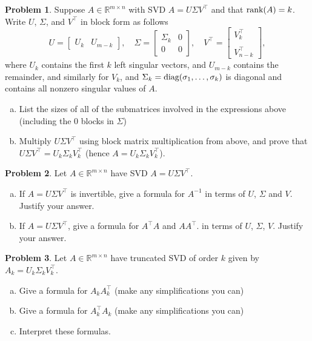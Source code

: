 \documentclass{amsart}[11pt]
\theoremstyle{definition}
\newtheorem{problem}{Problem}
\newcommand{\R}{\mathbb{R}}
\newcommand{\rank}{\textnormal{rank}}
\newcommand{\diag}{\textnormal{diag}}
\begin{document}
\begin{problem}
Suppose $A\in\R^{m\times n}$ with SVD $A=U\Sigma V^\top$ and that $\rank(A)=k$.  Write $U$, $\Sigma$, and $V^\top$ in block form as follows
\[ U = \begin{bmatrix} U_k & U_{m-k}\end{bmatrix},\quad \Sigma = \begin{bmatrix} \Sigma_k & 0\\0 & 0\end{bmatrix},\quad V^\top = \begin{bmatrix} V_k^\top \\\\ V_{n-k}^\top\end{bmatrix}, \]
where $U_k$ contains the first $k$ left singular vectors, and $U_{m-k}$ contains the remainder, and similarly for $V_k$, and $\Sigma_k = \diag(\sigma_1,\dots,\sigma_k)$ is diagonal and contains all nonzero singular values of $A$.

\begin{enumerate}[(a)]
\item List the sizes of all of the submatrices involved in the expressions above (including the $0$ blocks in $\Sigma$)
\item Multiply $U\Sigma V^\top$ using block matrix multiplication from above, and prove that $U\Sigma V^\top = U_k\Sigma_kV_k^\top$ (hence $A=U_k\Sigma_kV_k^\top$).
\end{enumerate}
\end{problem}

\begin{problem}
Let $A\in\R^{m\times n}$ have SVD $A=U\Sigma V^\top$.
\begin{enumerate}[(a)]
\item If $A=U\Sigma V^\top$ is invertible, give a formula for $A^{-1}$ in terms of $U$, $\Sigma$ and $V$. Justify your answer.
\item If $A=U\Sigma V^\top$, give a formula for $A^\top A$ and $AA^\top$. in terms of $U$, $\Sigma$, $V$. Justify your answer.
\end{enumerate}
\end{problem}

\begin{problem}
Let $A\in\R^{m\times n}$ have truncated SVD of order $k$ given by $A_k=U_k\Sigma_kV_k^{\top}$. 
\begin{enumerate}[(a)]
\item Give a formula for $A_kA_k^\top$ (make any simplifications you can)
\item Give a formula for $A_k^\top A_k$ (make any simplifications you can)
\item Interpret these formulas.
\end{enumerate}
\end{problem}
\end{document}
